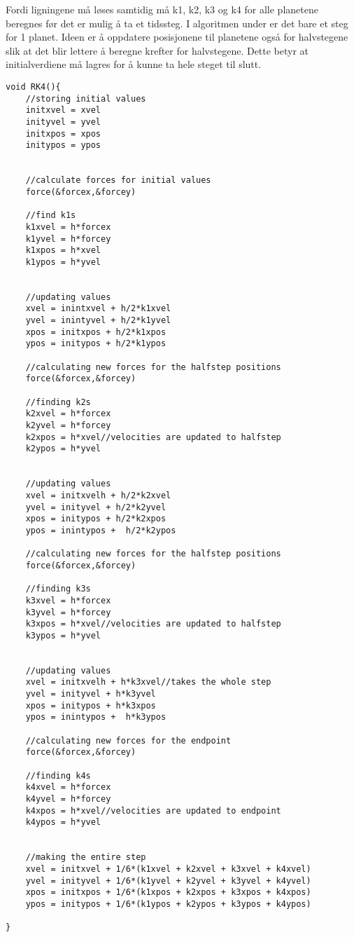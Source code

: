 \documentclass[a4paper, 12pt]{article}
\begin{document}
Fordi ligningene må løses samtidig må k1, k2, k3 og k4 for alle planetene beregnes før det er mulig å ta et tidssteg. I algoritmen under er det bare et steg for 1 planet. Ideen er å oppdatere posisjonene til planetene også for halvstegene slik at det blir lettere å beregne krefter for halvstegene. Dette betyr at initialverdiene må lagres for å kunne ta hele steget til slutt. 
 \begin{lstlisting}
void RK4(){
	//storing initial values
	initxvel = xvel
	inityvel = yvel
	initxpos = xpos
	initypos = ypos	
	
	
	//calculate forces for initial values
	force(&forcex,&forcey)
	
	//find k1s
	k1xvel = h*forcex
	k1yvel = h*forcey
	k1xpos = h*xvel
	k1ypos = h*yvel

	
	//updating values
	xvel = inintxvel + h/2*k1xvel
	yvel = inintyvel + h/2*k1yvel
	xpos = initxpos + h/2*k1xpos
	ypos = initypos + h/2*k1ypos
	
	//calculating new forces for the halfstep positions
	force(&forcex,&forcey)
	
	//finding k2s
	k2xvel = h*forcex
	k2yvel = h*forcey
	k2xpos = h*xvel//velocities are updated to halfstep
	k2ypos = h*yvel

	
	//updating values
	xvel = initxvelh + h/2*k2xvel
	yvel = inityvel + h/2*k2yvel
	xpos = initypos + h/2*k2xpos
	ypos = inintypos +  h/2*k2ypos
	
	//calculating new forces for the halfstep positions
	force(&forcex,&forcey)
	
	//finding k3s
	k3xvel = h*forcex
	k3yvel = h*forcey
	k3xpos = h*xvel//velocities are updated to halfstep
	k3ypos = h*yvel

	
	//updating values
	xvel = initxvelh + h*k3xvel//takes the whole step
	yvel = inityvel + h*k3yvel
	xpos = initypos + h*k3xpos
	ypos = inintypos +  h*k3ypos
	
	//calculating new forces for the endpoint
	force(&forcex,&forcey)
	
	//finding k4s
	k4xvel = h*forcex
	k4yvel = h*forcey
	k4xpos = h*xvel//velocities are updated to endpoint
	k4ypos = h*yvel
	
	
	//making the entire step
	xvel = initxvel + 1/6*(k1xvel + k2xvel + k3xvel + k4xvel)
	yvel = inityvel + 1/6*(k1yvel + k2yvel + k3yvel + k4yvel)
	xpos = initxpos + 1/6*(k1xpos + k2xpos + k3xpos + k4xpos)
	ypos = initypos + 1/6*(k1ypos + k2ypos + k3ypos + k4ypos)
	
} 
 \end{lstlisting}
 
\end{document}
